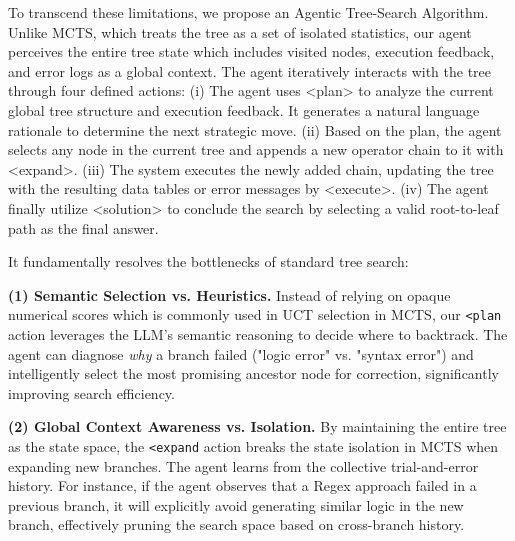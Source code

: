 To transcend these limitations, we propose an {Agentic Tree-Search Algorithm}. Unlike MCTS, which treats the tree as a set of isolated statistics, our agent perceives the entire tree state which includes visited nodes, execution feedback, and error logs as a global context. The agent iteratively interacts with the tree through four defined actions: (i) The agent uses <plan> to analyze the current global tree structure and execution feedback. It generates a natural language rationale to determine the next strategic move. (ii) Based on the plan, the agent selects any node in the current tree and appends a new operator chain to it with <expand>. (iii) The system executes the newly added chain, updating the tree with the resulting data tables or error messages by <execute>. (iv) The agent finally utilize <solution> to conclude the search by selecting a valid root-to-leaf path as the final answer.

It fundamentally resolves the bottlenecks of standard tree search:

\textbf{(1) Semantic Selection vs. Heuristics.}
Instead of relying on opaque numerical scores which is commonly used in UCT selection in MCTS, our \texttt{<plan} action leverages the LLM's semantic reasoning to decide where to backtrack. The agent can diagnose \textit{why} a branch failed (\eg "logic error" vs. "syntax error") and intelligently select the most promising ancestor node for correction, significantly improving search efficiency.

\textbf{(2) Global Context Awareness vs. Isolation.}
By maintaining the entire tree as the state space, the \texttt{<expand} action breaks the state isolation in MCTS when expanding new branches. The agent learns from the collective trial-and-error history. For instance, if the agent observes that a Regex approach failed in a previous branch, it will explicitly avoid generating similar logic in the new branch, effectively pruning the search space based on cross-branch history.

